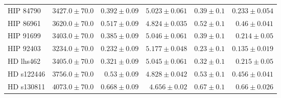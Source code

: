 \begin{longtable*}{lrrrrr}
HIP 84790 & $3427.0\pm 70.0$ & $0.392\pm 0.09$ & $5.023\pm 0.061$ & $0.39\pm 0.1$ & $0.233\pm 0.054$ \\ 
HIP 86961 & $3620.0\pm 70.0$ & $0.517\pm 0.09$ & $4.824\pm 0.035$ & $0.52\pm 0.1$ & $0.46\pm 0.041$ \\ 
HIP 91699 & $3403.0\pm 70.0$ & $0.385\pm 0.09$ & $5.046\pm 0.061$ & $0.39\pm 0.1$ & $0.214\pm 0.05$ \\ 
HIP 92403 & $3234.0\pm 70.0$ & $0.232\pm 0.09$ & $5.177\pm 0.048$ & $0.23\pm 0.1$ & $0.135\pm 0.019$ \\ 
HD lhs462 & $3405.0\pm 70.0$ & $0.321\pm 0.09$ & $5.045\pm 0.061$ & $0.32\pm 0.1$ & $0.215\pm 0.05$ \\ 
HD s122446 & $3756.0\pm 70.0$ & $0.53\pm 0.09$ & $4.828\pm 0.042$ & $0.53\pm 0.1$ & $0.456\pm 0.041$ \\ 
HD s130811 & $4073.0\pm 70.0$ & $0.668\pm 0.09$ & $4.656\pm 0.02$ & $0.67\pm 0.1$ & $0.66\pm 0.026$ \\ 
\bottomrule 
\end{longtable*} 
